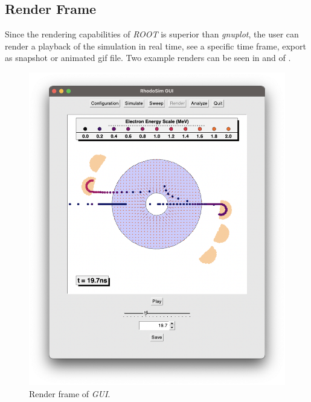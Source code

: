 \documentclass{book}
\begin{document}
\clearpage
\subsection{Render Frame}
Since the rendering capabilities of \textit{ROOT} is superior than \textit{gnuplot}, the user can render a playback of the simulation in real time, 
see a specific time frame, export as snapshot or animated gif file.
Two example renders can be seen in  and  of .
\vspace{10pt}
\begin{figure}[h]
    \centering
    \includegraphics[width=0.85\linewidth]{../../../figures/rhodoSim/GUI_render_frame_5.png}
    \caption{Render frame of \textit{GUI}.}
    \label{fig:gui_render_1}
\end{figure}
\end{document}

